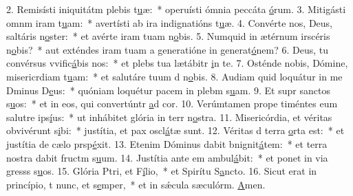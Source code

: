 2. Remisísti iniquitátm plebis t\uline{u}æ:~* operuísti ómnia peccáta \uline{ó}rum.
3. Mitigásti omnm iram t\uline{u}am:~* avertísti ab ira indignatións t\uline{u}æ.
4. Convérte nos, Deus, saltáris n\uline{o}ster:~* et avérte iram tuam  n\uline{o}bis.
5. Numquid in ætérnum irscéris n\uline{o}bis?~* aut exténdes iram tuam a generatióne in generat\uline{ó}nem?
6. Deus, tu convérsus vvific\uline{á}bis nos:~* et plebs tua lætábitr \uline{i}n te.
7. Osténde nobis, Dómine, misericrdiam t\uline{u}am:~* et salutáre tuum d n\uline{o}bis.
8. Audiam quid loquátur in me Dminus D\uline{e}us:~* quóniam loquétur pacem in plebm s\uline{u}am.
9. Et supr sanctos s\uline{u}os:~* et in eos, qui convertúntr \uline{a}d cor.
10. Verúmtamen prope timéntes eum salutre ips\uline{í}us:~* ut inhábitet glória in terr n\uline{o}stra.
11. Misericórdia, et véritas obvivérunt s\uline{i}bi:~* justítia, et pax oscl\uline{á}tæ sunt.
12. Véritas d terra \uline{o}rta est:~* et justítia de cælo prsp\uline{é}xit.
13. Etenim Dóminus dabit bnignit\uline{á}tem:~* et terra nostra dabit fructm s\uline{u}um.
14. Justítia ante em ambul\uline{á}bit:~* et ponet in via gresss s\uline{u}os.
15. Glória Ptri, et F\uline{í}lio,~* et Spirítu S\uline{a}ncto.
16. Sicut erat in princípio, t nunc, et s\uline{e}mper,~* et in sǽcula sæculórm. \uline{A}men.
